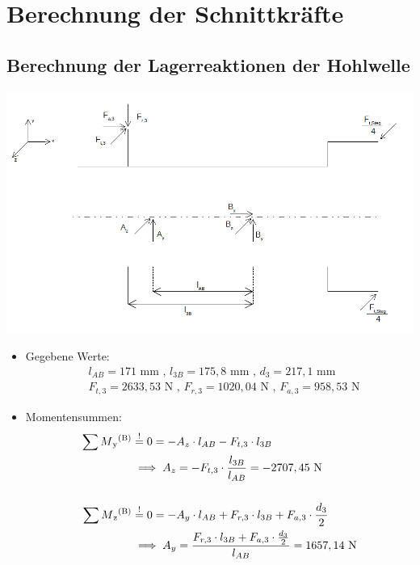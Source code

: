 \newpage
\chapter{Berechnung der Schnittkräfte}
\section{Berechnung der Lagerreaktionen der Hohlwelle}
\begin{center}
	\includegraphics[width=1.04\textwidth,keepaspectratio]{figures/Hohlwelle.png}
\end{center}
\begin{itemize}
	\item Gegebene Werte: 
\begin{align*}
	&l_{AB} =171\text{ mm} \text{ , } l_{3B} = 175,8\text{ mm} \text{ , } d_{3} = 217,1\text{ mm}\\
	&F_{t,3} = 2633,53 \text{ N} \text{ , } F_{r,3}  = 1020,04\text{ N} \text{ , } F_{a,3} = 958,53 \text{ N}
\end{align*}
	\item Momentensummen:
\begin{align*}
	 \sum M\textsubscript{y}\textsuperscript{(B)} &\overset{!}{=} 0 = -A_z \cdot l_{AB} - F_{t,3} \cdot l_{3B} \\
	 	&\implies A_z = -F_{t,3} \cdot \frac{l_{3B}}{l_{AB}} = -2707,45 \text{ N} \\ \\
	 \sum M\textsubscript{z}\textsuperscript{(B)} &\overset{!}{=} 0 = -A_y \cdot l_{AB} + F_{r,3} \cdot l_{3B} + F_{a,3} \cdot \frac{d_3}{2}\\
	 	&\implies A_y = \frac{F_{r,3} \cdot l_{3B} + F_{a,3} \cdot \frac{d_3}{2}} {l_{AB}}= 1657,14 \text{ N} 
\end{align*}
\end{itemize}
